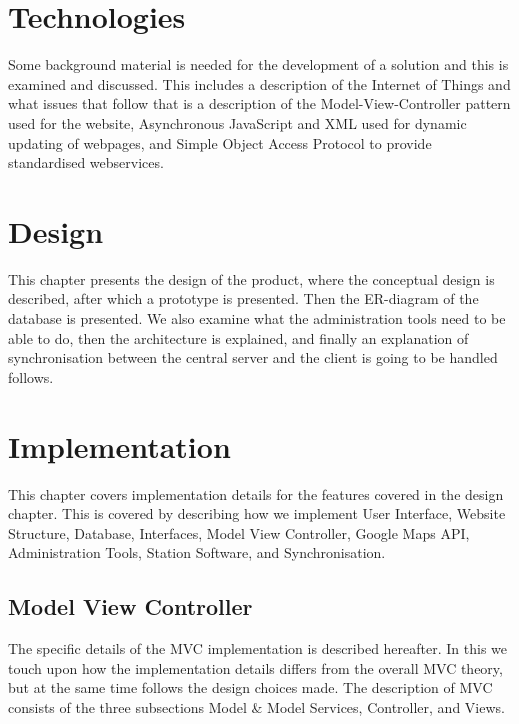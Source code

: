 	\chapter{Technologies}
	Some background material is needed for the development of a solution and this is examined and discussed. This includes a description of the Internet of Things and what issues that follow that is a description of the Model-View-Controller pattern used for the website, Asynchronous JavaScript and XML used for dynamic updating of webpages, and Simple Object Access Protocol to provide standardised webservices.
	
	
	
    
		
	\chapter{Design}
	This chapter presents the design of the product, where the conceptual design is described, after which a prototype is presented. 
	Then the ER-diagram of the database is presented. 
	We also examine what the administration tools need to be able to do, then the architecture is explained, and finally an explanation of synchronisation between the central server and the client is going to be handled follows.
	
	
	
	
	
	
	
	
	\chapter{Implementation}
	This chapter covers implementation details for the features covered in the design chapter.
	This is covered by describing how we implement User Interface, Website Structure, Database, Interfaces, Model View Controller, Google Maps API, Administration Tools, Station Software, and Synchronisation.
	 
	
	
	
	
	\section{Model View Controller}
	The specific details of the MVC implementation is described hereafter. In this we touch upon how the implementation details differs from the overall MVC theory, but at the same time follows the design choices made. The description of MVC consists of the three subsections Model \& Model Services, Controller, and Views.
	
	
	
	
	
	
	
	
